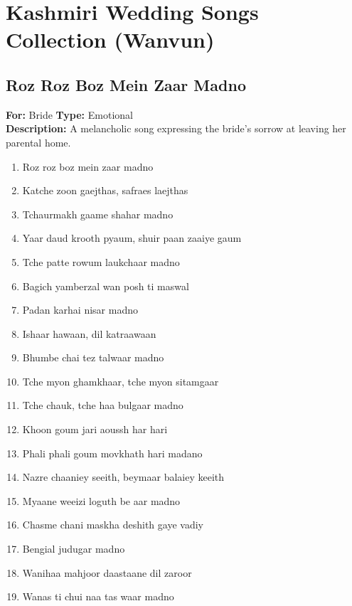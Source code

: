 \documentclass[12pt]{article}
\newcommand{\bigroman}[1]{\fontsize{16pt}{18pt}\selectfont\RaggedRight #1}
\begin{document}

\section*{Kashmiri Wedding Songs Collection (Wanvun)}

\subsection*{Roz Roz Boz Mein Zaar Madno}
\textbf{For:} Bride \quad \textbf{Type:} Emotional\\
\textbf{Description:} A melancholic song expressing the bride's sorrow at leaving her parental home.

\begin{multicols}{2}
\begin{enumerate}[leftmargin=*, label=\arabic*., font=\fontsize{16pt}{18pt}\selectfont]
  \item \bigroman{Roz roz boz mein zaar madno}
  \item \bigroman{Katche zoon gaejthas, safraes laejthas}
  \item \bigroman{Tchaurmakh gaame shahar madno}
  \item \bigroman{Yaar daud krooth pyaum, shuir paan zaaiye gaum}
  \item \bigroman{Tche patte rowum laukchaar madno}
  \item \bigroman{Bagich yamberzal wan posh ti maswal}
  \item \bigroman{Padan karhai nisar madno}
  \item \bigroman{Ishaar hawaan, dil katraawaan}
  \item \bigroman{Bhumbe chai tez talwaar madno}
  \item \bigroman{Tche myon ghamkhaar, tche myon sitamgaar}
  \item \bigroman{Tche chauk, tche haa bulgaar madno}
  \item \bigroman{Khoon goum jari aoussh har hari}
  \item \bigroman{Phali phali goum movkhath hari madano}
  \item \bigroman{Nazre chaaniey seeith, beymaar balaiey keeith}
  \item \bigroman{Myaane weeizi loguth be aar madno}
  \item \bigroman{Chasme chani maskha deshith gaye vadiy}
  \item \bigroman{Bengial judugar madno}
  \item \bigroman{Wanihaa mahjoor daastaane dil zaroor}
  \item \bigroman{Wanas ti chui naa tas waar madno}
\end{enumerate}


\end{multicols}
\end{document}

